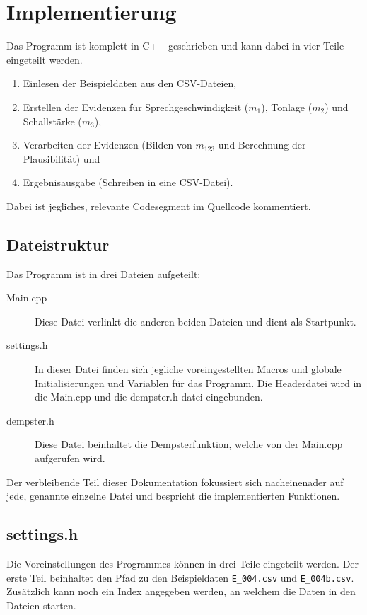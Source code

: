 \chapter{Implementierung}
Das Programm ist komplett in C++ geschrieben und kann dabei in vier Teile eingeteilt werden.

\begin{enumerate}
  \item Einlesen der Beispieldaten aus den CSV-Dateien,
  \item Erstellen der Evidenzen für Sprechgeschwindigkeit (\(m_1\)), Tonlage (\(m_2\)) und Schallstärke (\(m_3\)),
  \item Verarbeiten der Evidenzen (Bilden von \(m_123\) und Berechnung der Plausibilität) und
  \item Ergebnisausgabe (Schreiben in eine CSV-Datei).
\end{enumerate}

Dabei ist jegliches, relevante Codesegment im Quellcode kommentiert.

\section{Dateistruktur}
Das Programm ist in drei Dateien aufgeteilt:

\begin{description}
  \item [Main.cpp] Diese Datei verlinkt die anderen beiden Dateien und dient als Startpunkt. 
  \item [settings.h] In dieser Datei finden sich jegliche voreingestellten Macros und globale Initialisierungen und Variablen für das Programm. Die Headerdatei wird in die Main.cpp und die dempster.h datei eingebunden.
  \item [dempster.h] Diese Datei beinhaltet die Dempsterfunktion, welche von der Main.cpp aufgerufen wird.
  \end{description}

 Der verbleibende Teil dieser Dokumentation fokussiert sich nacheinenader auf jede, genannte einzelne Datei und bespricht die implementierten Funktionen.

\section{settings.h}
Die Voreinstellungen des Programmes können in drei Teile eingeteilt werden.
Der erste Teil beinhaltet den Pfad zu den Beispieldaten \verb|E_004.csv| und \verb|E_004b.csv|. Zusätzlich kann noch ein Index angegeben werden, an welchem die Daten in den Dateien starten.

